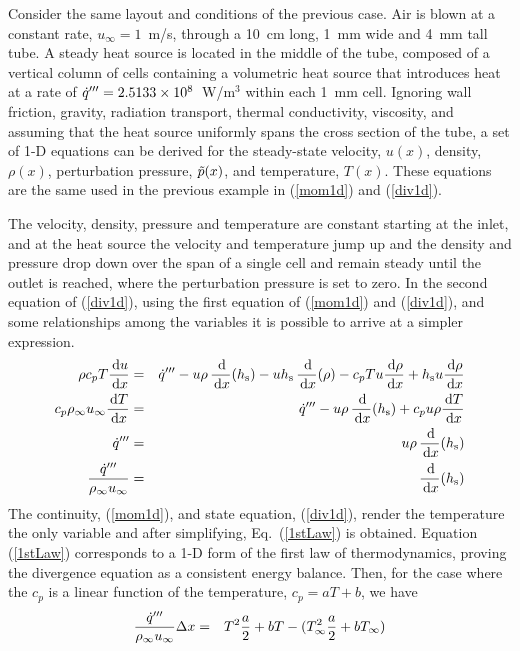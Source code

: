 \documentclass[11pt]{book}
\begin{document}
Consider the same layout and conditions of the previous case. Air is blown at a constant rate, $u_\infty=1$~m/s, through a 10~cm long, 1~mm wide and 4~mm tall tube. A steady heat source is located in the middle of the tube, composed of a vertical column of cells containing a volumetric heat source that introduces heat at a rate of $\dot{q}'''=2.5133 \times 10^8$~W/m$^3$ within each 1~mm cell. Ignoring wall friction, gravity, radiation transport, thermal conductivity, viscosity, and assuming that the heat source uniformly spans the cross section of the tube, a set of 1-D equations can be derived for the steady-state velocity, $u(x)$, density, $\rho(x)$, perturbation pressure, $\tilde{p}(x)$, and temperature, $T(x)$. These equations are the same used in the previous example in (\ref{mom1d}) and (\ref{div1d}).

The velocity, density, pressure and temperature are constant starting at the inlet, and at the heat source the velocity and temperature jump up and the density and pressure drop down over the span of a single cell and remain steady until the outlet is reached, where the perturbation pressure is set to zero. In the second equation of (\ref{div1d}), using the first equation of (\ref{mom1d}) and (\ref{div1d}), and some relationships among the variables it is possible to arrive at a simpler expression.
\begin{eqnarray}
   \rho c_p T \frac{\,\mathrm{d} u}{\,\mathrm{d} x}  &=& \dot{q}''' - u \rho \, \frac{\,\mathrm{d}}{\,\mathrm{d} x} (h_{\rm s}) - u h_{\rm s} \, \frac{\,\mathrm{d}}{\,\mathrm{d} x} (\rho) - c_p T u \frac{\,\mathrm{d} \rho}{\,\mathrm{d} x}  + h_{\rm s} u \frac{\,\mathrm{d} \rho}{\,\mathrm{d} x} \\
   c_p \rho_\infty u_\infty \frac{\,\mathrm{d} T}{\,\mathrm{d} x} &=& \dot{q}'''  - u \rho \, \frac{\,\mathrm{d}}{\,\mathrm{d} x} (h_{\rm s}) + c_p u \rho \frac{\,\mathrm{d} T}{\,\mathrm{d} x}  \\
  \dot{q}''' &=&   u \rho \, \frac{\,\mathrm{d}}{\,\mathrm{d} x} (h_{\rm s}) \\
  \frac{ \dot{q}'''}{\rho_\infty u_\infty} &=&  \frac{\,\mathrm{d}}{\,\mathrm{d} x} (h_{\rm s})  \label{1stLaw}
\end{eqnarray}
The continuity, (\ref{mom1d}), and state equation, (\ref{div1d}), render the temperature the only variable and after simplifying, Eq.~(\ref{1stLaw}) is obtained. Equation (\ref{1stLaw}) corresponds to a 1-D form of the first law of thermodynamics, proving the divergence equation as a consistent energy balance. Then, for the case where the $c_p$ is a linear function of the temperature, $c_p=aT +b$, we have
\begin{eqnarray}
  \frac{ \dot{q}'''}{\rho_\infty u_\infty} \Delta x &=&  T^2 \frac{a}{2} +bT -  (T_\infty^2 \frac{a}{2} +bT_\infty) \label{LinearCP}
\end{eqnarray}
\end{document}
